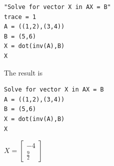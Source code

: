 \begin{Verbatim}[formatcom=\color{blue},samepage=true]
"Solve for vector X in AX = B"
trace = 1
A = ((1,2),(3,4))
B = (5,6)
X = dot(inv(A),B)
X
\end{Verbatim}

\noindent
The result is

\begin{Verbatim}
Solve for vector X in AX = B
A = ((1,2),(3,4))
B = (5,6)
X = dot(inv(A),B)
X
\end{Verbatim}

\noindent
$X=\begin{bmatrix}-4\\ \frac{9}{2}\end{bmatrix}$
